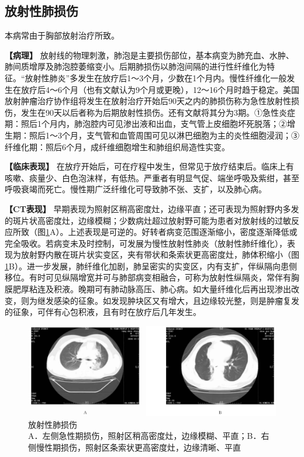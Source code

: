 \subsection{放射性肺损伤}

本病常由于胸部放射治疗所致。

\textbf{【病理】}
放射线的物理刺激，肺泡是主要损伤部位，基本病变为肺充血、水肿、肺间质增厚及肺泡腔萎缩变小。后期肺损伤以肺泡间隔的进行性纤维化为特征。“放射性肺炎”多发生在放疗后1～3个月，少数在1个月内。慢性纤维化一般发生在放疗后4～6个月（也有文献认为9个月或更晚），12～16个月时趋于稳定。美国放射肿瘤治疗协作组将发生在放射治疗开始后90天之内的肺损伤称为急性放射性损伤，发生在90天以后者称为后期放射性损伤。还有文献将其分为3期。①急性炎症期：照后1个月内，肺泡腔内可见渗出液和出血，支气管上皮细胞坏死脱落；②增生期：照后1～3个月，支气管和血管周围可见以淋巴细胞为主的炎性细胞浸润；③纤维化期：照后6个月，成纤维细胞增生和肺组织局造性实变。

\textbf{【临床表现】}
在放疗开始后，可在疗程中发生，但常见于放疗结束后。临床上有咳嗽、痰量少、白色泡沫样，有低热。严重者有明显气促、端坐呼吸及紫绀，甚至呼吸衰竭而死亡。慢性期广泛纤维化可导致肺不张、支扩，以及肺心病。

\textbf{【CT表现】}
早期表现为照射区稍高密度灶，边缘平直；还可表现为照射野内多发的斑片状高密度灶，边缘模糊；少数病灶超过放射野可能为患者对放射线的过敏反应所致（图\ref{fig9-35}A）。上述表现是可逆的。好转者病变范围逐渐缩小，密度逐渐降低或完全吸收。若病变未及时控制，可发展为慢性放射性肺炎（放射性肺纤维化），表现为放射野内散在斑片状实变区，夹有带状和条索状更高密度灶，肺体积缩小（图\ref{fig9-35}B）。进一步发展，肺纤维化加剧，肺呈密实的实变区，内有支扩，伴纵隔向患侧移位。有时可见纵隔增宽并可与肺部病变相融合，可称为放射性纵隔炎，常伴有胸膜肥厚粘连及积液。晚期可有肺动脉高压、肺心病。如大量纤维化后再出现渗出改变，则为继发感染的征象。如发现肿块区又有增大，且边缘较光整，则是肿瘤复发的征象，可伴有心包积液，且有时在放疗后几年发生。

\begin{figure}[!htbp]
 \centering
 \includegraphics[width=.7\textwidth,height=\textheight,keepaspectratio]{./images/Image00226.jpg}
 \captionsetup{justification=centering}
 \caption{放射性肺损伤\\{\small A．左侧急性期损伤，照射区稍高密度灶，边缘模糊、平直；B．右侧慢性期损伤，照射区条索状更高密度灶，边缘清晰、平直}}
 \label{fig9-35}
  \end{figure} 

